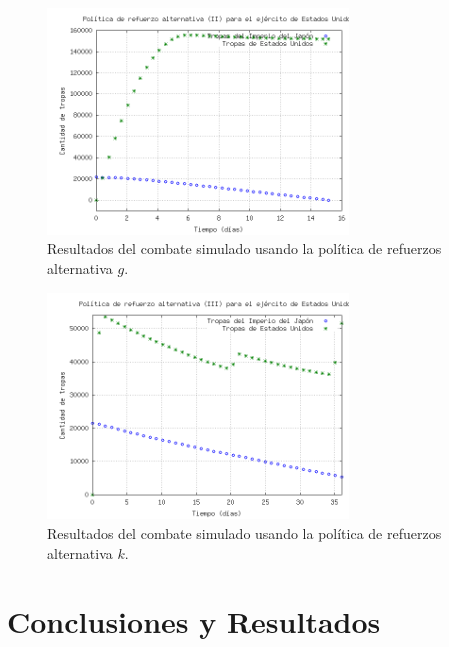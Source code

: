 \documentclass{sig-alternate}
\begin{document}
\begin{figure}[h]
\begin{center}
\includegraphics[width=8cm]{reinforce3.png}
\caption{\label{fig:reinforce3}Resultados del combate simulado usando la política de refuerzos alternativa $g$.}
\end{center}
\end{figure}


\begin{figure}[h]
\begin{center}
\includegraphics[clip, width=8cm]{reinforce4.png}
\caption{\label{fig:reinforce4}Resultados del combate simulado usando la política de refuerzos alternativa $k$.}
\end{center}
\end{figure}


\section{Conclusiones y Resultados}
\end{document}
